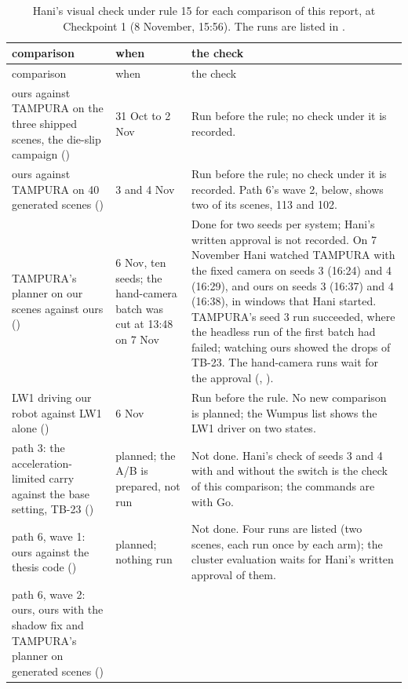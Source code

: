 \begin{small}
\renewcommand{\arraystretch}{1.25}
\begin{longtable}{@{}P{0.26\textwidth}P{0.19\textwidth}P{0.49\textwidth}@{}}
\caption[Hani's visual check for each comparison.]{Hani's visual check under rule 15 for
each comparison of this report, at Checkpoint 1 (8 November, 15:56). The runs are listed
in .}\label{tab:visual-check}\\
\toprule
comparison & when & the check \\
\midrule
\endfirsthead
\toprule
comparison & when & the check \\
\midrule
\endhead
\bottomrule
\endfoot
ours against TAMPURA on the three shipped scenes, the die-slip campaign () &
31 Oct to 2 Nov &
Run before the rule; no check under it is recorded. \\
ours against TAMPURA on 40 generated scenes () &
3 and 4 Nov &
Run before the rule; no check under it is recorded. Path 6's wave 2, below, shows two
of its scenes, 113 and 102. \\
TAMPURA's planner on our scenes against ours () &
6 Nov, ten seeds; the hand-camera batch was cut at 13:48 on 7 Nov &
Done for two seeds per system; Hani's written approval is not recorded. On 7 November
Hani watched TAMPURA with the fixed camera on seeds 3 (16:24) and 4 (16:29), and ours on
seeds 3 (16:37) and 4 (16:38), in windows that Hani started. TAMPURA's seed 3 run
succeeded, where the headless run of the first batch had failed; watching ours showed
the drops of TB-23. The hand-camera runs wait for the approval
(, ). \\
LW1 driving our robot against LW1 alone () &
6 Nov &
Run before the rule. No new comparison is planned; the Wumpus list shows the LW1
driver on two states. \\
path 3: the acceleration-limited carry against the base setting, TB-23 () &
planned; the A/B is prepared, not run &
Not done. Hani's check of seeds 3 and 4 with and without the switch is the check of
this comparison; the commands are with Go. \\
path 6, wave 1: ours against the thesis code () &
planned; nothing run &
Not done. Four runs are listed (two scenes, each run once by each arm); the cluster
evaluation waits for Hani's written approval of them. \\
path 6, wave 2: ours, ours with the shadow fix and TAMPURA's planner on generated
scenes () &

\end{longtable}
\end{small}
